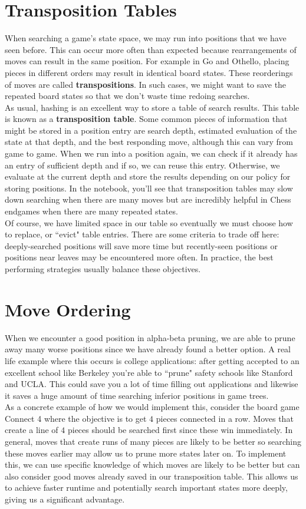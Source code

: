 \documentclass[12pt, letterpaper]{article}
\begin{document}
\section*{Transposition Tables}
When searching a game's state space, we may run into positions that we have seen before. This can occur more often than expected because rearrangements of moves can result in the same position. For example in Go and Othello, placing pieces in different orders may result in identical board states. These reorderings of moves are called \textbf{transpositions}. In such cases, we might want to save the repeated board states so that we don't waste time redoing searches. \\
As usual, hashing is an excellent way to store a table of search results. This table is known as a \textbf{transposition table}. Some common pieces of information that might be stored in a position entry are search depth, estimated evaluation of the state at that depth, and the best responding move, although this can vary from game to game. When we run into a position again, we can check if it already has an entry of sufficient depth and if so, we can reuse this entry. Otherwise, we evaluate at the current depth and store the results depending on our policy for storing positions. In the notebook, you'll see that transposition tables may slow down searching when there are many moves but are incredibly helpful in Chess endgames when there are many repeated states. \\
Of course, we have limited space in our table so eventually we must choose how to replace, or ``evict" table entries. There are some criteria to trade off here: deeply-searched positions will save more time but recently-seen positions or positions near leaves may be encountered more often. In practice, the best performing strategies usually balance these objectives.
\section*{Move Ordering}
When we encounter a good position in alpha-beta pruning, we are able to prune away many worse positions since we have already found a better option. A real life example where this occurs is college applications: after getting accepted to an excellent school like Berkeley you're able to ``prune" safety schools like Stanford and UCLA. This could save you a lot of time filling out applications and likewise it saves a huge amount of time searching inferior positions in game trees. \\
As a concrete example of how we would implement this, consider the board game Connect 4 where the objective is to get $4$ pieces connected in a row. Moves that create a line of $4$ pieces should be searched first since these win immediately. In general, moves that create runs of many pieces are likely to be better so searching these moves earlier may allow us to prune more states later on. To implement this, we can use specific knowledge of which moves are likely to be better but can also consider good moves already saved in our transposition table. This allows us to achieve faster runtime and potentially search important states more deeply, giving us a significant advantage.
\end{document}
